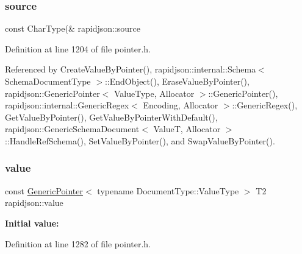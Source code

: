 \mbox{\label{namespacerapidjson_a37a3d95ab06aa7542487bb76e704885c}} 
\subsubsection{\texorpdfstring{source}{source}}
{\footnotesize\ttfamily const Char\+Type(\& rapidjson\+::source}



Definition at line 1204 of file pointer.\+h.



Referenced by Create\+Value\+By\+Pointer(), rapidjson\+::internal\+::\+Schema$<$ Schema\+Document\+Type $>$\+::\+End\+Object(), Erase\+Value\+By\+Pointer(), rapidjson\+::\+Generic\+Pointer$<$ Value\+Type, Allocator $>$\+::\+Generic\+Pointer(), rapidjson\+::internal\+::\+Generic\+Regex$<$ Encoding, Allocator $>$\+::\+Generic\+Regex(), Get\+Value\+By\+Pointer(), Get\+Value\+By\+Pointer\+With\+Default(), rapidjson\+::\+Generic\+Schema\+Document$<$ Value\+T, Allocator $>$\+::\+Handle\+Ref\+Schema(), Set\+Value\+By\+Pointer(), and Swap\+Value\+By\+Pointer().

\mbox{\label{namespacerapidjson_a1a75d60792094d496b500c40776030dd}} 
\subsubsection{\texorpdfstring{value}{value}}
{\footnotesize\ttfamily const \mbox{\hyperlink{classrapidjson_1_1_generic_pointer}{Generic\+Pointer}}$<$ typename Document\+Type\+::\+Value\+Type $>$ T2 rapidjson\+::value}

{\bfseries Initial value\+:}
\begin{DoxyCode}{0}
\DoxyCodeLine{\{}

\end{DoxyCode}


Definition at line 1282 of file pointer.\+h.



